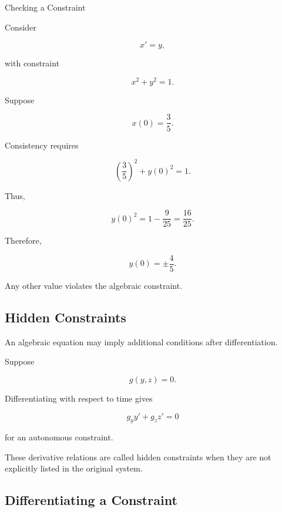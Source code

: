 \begin{workedexamplebox}{Checking a Constraint}

Consider

\[
x'=y,
\]

with constraint

\[
x^2+y^2=1.
\]

Suppose

\[
x(0)=\frac35.
\]

Consistency requires

\[
\left(
\frac35
\right)^2
+
y(0)^2
=
1.
\]

Thus,

\[
y(0)^2
=
1-\frac9{25}
=
\frac{16}{25}.
\]

Therefore,

\begin{answerbox}
\[
\boxed{
y(0)=\pm\frac45.
}
\]
\end{answerbox}

Any other value violates the algebraic constraint.

\end{workedexamplebox}

\subsection{Hidden Constraints}
\label{subsec:hidden-constraints-dae}

An algebraic equation may imply additional conditions after
differentiation.

Suppose

\[
\boxed{
g(y,z)=0.
}
\]

Differentiating with respect to time gives

\[
\boxed{
g_y y'
+
g_z z'
=
0
}
\]

for an autonomous constraint.

These derivative relations are called hidden constraints when they are
not explicitly listed in the original system.

\subsection{Differentiating a Constraint}
\label{subsec:differentiating-dae-constraint}

